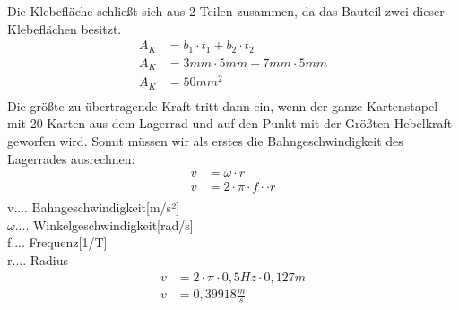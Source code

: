 Die Klebefläche schließt sich aus 2 Teilen zusammen, da das Bauteil zwei dieser Klebeflächen besitzt.
\begin{align*}
A_{K} &= b_{1}\cdot t_{1}+b_{2}\cdot t_{2}\\
A_{K} &=3 mm\cdot 5 mm+7 mm\cdot 5 mm\\
A_{K} &= 50 mm^{2}\\
\end{align*}
Die größte zu übertragende Kraft tritt dann ein, wenn der ganze Kartenstapel mit 20 Karten aus dem
Lagerrad und auf den Punkt mit der Größten Hebelkraft geworfen wird.
Somit müssen wir als erstes die Bahngeschwindigkeit des Lagerrades ausrechnen:
\begin{align*}
v &= \omega \cdot r\\
v &= 2 \cdot \pi \cdot f \cdot \cdot r\\
\end{align*}
v.... Bahngeschwindigkeit[m/s²]\\
$\omega$.... Winkelgeschwindigkeit[rad/s]\\
f.... Frequenz[1/T]\\
r.... Radius\\
\begin{align*}
v &= 2 \cdot \pi \cdot 0,5 Hz \cdot 0,127 m\\
v &= 0,39918 \tfrac{m}{s}\\
\end{align*}

